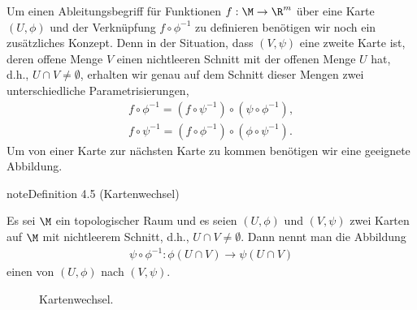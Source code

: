 \documentclass[letterpaper,10pt,english]{jupyterBook}
\let\sphinxpxdimen\pdfpxdimen\else\newdimen\sphinxpxdimen
\begin{document}
\sphinxAtStartPar
Um einen Ableitungsbegriff für Funktionen \(f:\M\to\R^m\) über eine Karte \((U,\phi)\) und der Verknüpfung \(f\circ \phi^{-1}\) zu definieren benötigen wir noch ein zusätzliches Konzept.
Denn in der Situation, dass \((V,\psi)\) eine zweite Karte ist, deren offene Menge \(V\) einen nichtleeren Schnitt mit der offenen Menge \(U\) hat, d.h., \(U\cap V \neq \emptyset\), erhalten wir genau auf dem Schnitt dieser Mengen zwei unterschiedliche Parametrisierungen,
\begin{equation*}
\begin{split}f\circ \phi^{-1} = (f\circ\psi^{-1})\circ(\psi\circ \phi^{-1}),\\
f\circ \psi^{-1} = (f\circ\phi^{-1})\circ(\phi\circ \psi^{-1}).\end{split}
\end{equation*}
\sphinxAtStartPar
Um von einer Karte zur nächsten Karte zu kommen benötigen wir eine geeignete Abbildung.
\label{manifolds/manifolds_prelim:definition-7}
\begin{sphinxadmonition}{note}{Definition 4.5 (Kartenwechsel)}



\sphinxAtStartPar
Es sei \(\M\) ein topologischer Raum und es seien \((U,\phi)\) und \((V,\psi)\) zwei Karten auf \(\M\) mit nicht\sphinxhyphen{}leerem Schnitt, d.h., \(U\cap V\neq \emptyset\).
Dann nennt man die Abbildung
\begin{equation*}
\begin{split}\psi\circ\phi^{-1}: \phi(U\cap V)\rightarrow \psi(U\cap V)\end{split}
\end{equation*}
\sphinxAtStartPar
einen  von \((U,\phi)\) nach \((V,\psi)\).
\end{sphinxadmonition}

\begin{figure}[htbp]
\centering
\capstart

\noindent\sphinxincludegraphics[height=450\sphinxpxdimen]{{chartchange}.jpg}
\caption{Kartenwechsel.}\label{\detokenize{manifolds/manifolds_prelim:fig-chartchange}}\end{figure}
\end{document}

